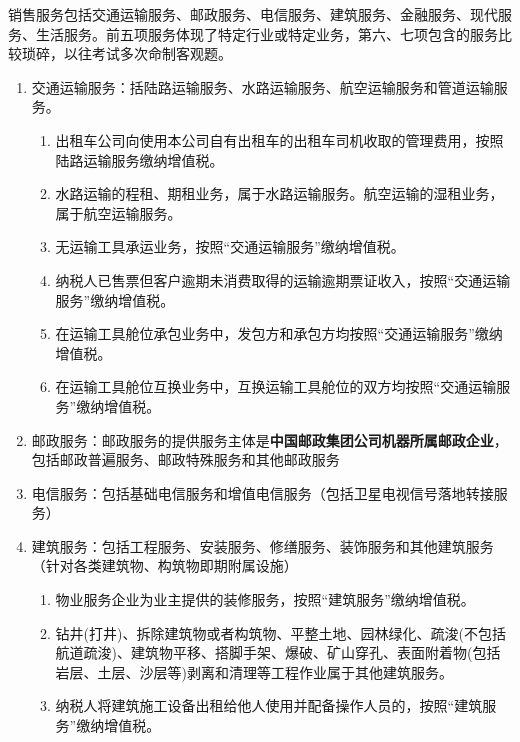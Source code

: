 \documentclass[UTF8,12pt]{ctexart}
\numberwithin{equation}{section} %
\numberwithin{figure}{section}
\numberwithin{table}{section}
\begin{document}
	销售服务包括交通运输服务、邮政服务、电信服务、建筑服务、金融服务、现代服务、生活服务。前五项服务体现了特定行业或特定业务，第六、七项包含的服务比较琐碎，以往考试多次命制客观题。
	\begin{enumerate}
		\item 交通运输服务：括陆路运输服务、水路运输服务、航空运输服务和管道运输服务。
		\begin{enumerate}
			\item 出租车公司向使用本公司自有出租车的出租车司机收取的管理费用，按照陆路运输服务缴纳增值税。
			
			\item 水路运输的程租、期租业务，属于水路运输服务。航空运输的湿租业务，属于航空运输服务。
			
			\item 无运输工具承运业务，按照“交通运输服务”缴纳增值税。
			
			\item 纳税人已售票但客户逾期未消费取得的运输逾期票证收入，按照“交通运输服务”缴纳增值税。
			
			\item 在运输工具舱位承包业务中，发包方和承包方均按照“交通运输服务”缴纳增值税。
			
			\item 在运输工具舱位互换业务中，互换运输工具舱位的双方均按照“交通运输服务”缴纳增值税。
		\end{enumerate}
		
		\item 邮政服务：邮政服务的提供服务主体是\textbf{中国邮政集团公司机器所属邮政企业}，包括邮政普遍服务、邮政特殊服务和其他邮政服务
		
		\item 电信服务：包括基础电信服务和增值电信服务（包括卫星电视信号落地转接服务）
		
		\item 建筑服务：包括工程服务、安装服务、修缮服务、装饰服务和其他建筑服务（针对各类建筑物、构筑物即期附属设施）
		\begin{enumerate}
			\item 物业服务企业为业主提供的装修服务，按照“建筑服务”缴纳增值税。
			
			\item 钻井(打井)、拆除建筑物或者构筑物、平整土地、园林绿化、疏浚(不包括航道疏浚)、建筑物平移、搭脚手架、爆破、矿山穿孔、表面附着物(包括岩层、土层、沙层等)剥离和清理等工程作业属于其他建筑服务。
			
			\item 纳税人将建筑施工设备出租给他人使用并配备操作人员的，按照“建筑服务”缴纳增值税。
		\end{enumerate}
		

\end{enumerate}
\end{document}
